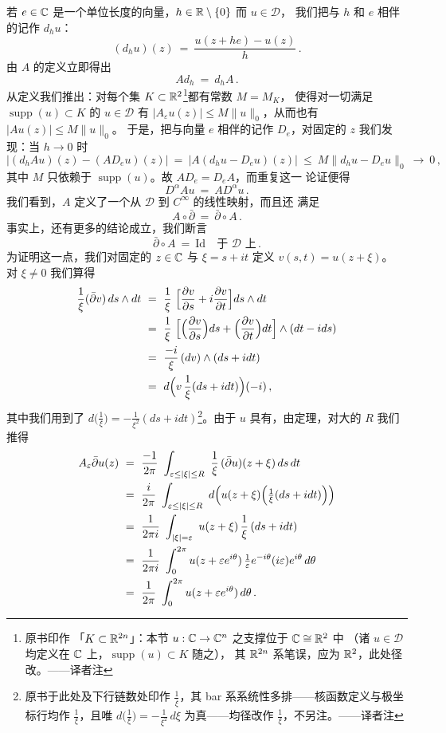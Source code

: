 若 $e\in\mathbb{C}$ 是一个单位长度的向量，$h\in\mathbb{R}\setminus\{0\}$ 而 $u\in\mathcal{D}$，%
我们把与 $h$ 和 $e$ 相伴的\trDifferenceQuotient{}记作 $d_{h}u$：
\[
(d_{h}u)(z)\ =\ \frac{u(z+he)-u(z)}{h}\,.
\]
由 $A$ 的定义立即得出
\[
Ad_{h}\ =\ d_{h}A\,.
\]
从定义我们推出：对每个\trCompact{}集 $K\subset\mathbb{R}^{2}$\footnote{原书印作%
「$K\subset\mathbb{R}^{2n}$」：本节 $u:\mathbb{C}\to\mathbb{C}^{n}$ 之支撑位于 $\mathbb{C}\cong\mathbb{R}^{2}$ 中%
（诸 $u\in\mathcal{D}$ 均定义在 $\mathbb{C}$ 上，$\operatorname{supp}(u)\subset K$ 随之），%
其 $\mathbb{R}^{2n}$ 系笔误，应为 $\mathbb{R}^{2}$，此处径改。——译者注}都有常数 $M=M_{K}$，%
使得对一切满足 $\operatorname{supp}(u)\subset K$ 的 $u\in\mathcal{D}$ 有%
 $|A_{\varepsilon}u(z)|\leq M\|u\|_{0}$，从而也有 $|Au(z)|\leq M\|u\|_{0}$。%
于是，把与向量 $e$ 相伴的\trDirectionalDerivative{}记作%
 $D_{e}$，对固定的 $z$ 我们发现：当 $h\to0$ 时
\[
\bigl|(d_{h}Au)(z)-(AD_{e}u)(z)\bigr|\ =\ \bigl|A(d_{h}u-D_{e}u)(z)\bigr|\ \leq\ M\|d_{h}u-D_{e}u\|_{0}\ \longrightarrow\ 0\,,
\]
其中 $M$ 只依赖于 $\operatorname{supp}(u)$。故 $AD_{e}=D_{e}A$，而重复这一%
论证便得
\[
D^{\alpha}Au\ =\ AD^{\alpha}u\,.
\]
我们看到，$A$ 定义了一个从 $\mathcal{D}$ 到 $C^{\infty}$ 的线性映射，而且还%
满足
\[
A\circ\bar{\partial}\ =\ \bar{\partial}\circ A\,.
\]
事实上，还有更多的结论成立，我们断言
\[
\bar{\partial}\circ A\ =\ \mathrm{Id}\quad\text{于 }\mathcal{D}\text{ 上}\,.
\]
为证明这一点，我们对固定的 $z\in\mathbb{C}$ 与 $\xi=s+it$ 定义 $v(s,t)=u(z+\xi)$。%
对 $\xi\neq0$ 我们算得
\begin{align*}
\frac{1}{\xi}(\bar{\partial}v)\,ds\wedge dt\ &=\ \frac{1}{\xi}\ \Bigl[\frac{\partial v}{\partial s}+i\frac{\partial v}{\partial t}\Bigr]ds\wedge dt\\
&=\ \frac{1}{\xi}\ \Bigl[\Bigl(\frac{\partial v}{\partial s}\Bigr)ds+\Bigl(\frac{\partial v}{\partial t}\Bigr)dt\Bigr]\wedge(dt-ids)\\
&=\ \frac{-i}{\xi}\,(dv)\wedge(ds+idt)\\
&=\ d\Bigl(v\,\frac{1}{\xi}(ds+idt)\Bigr)(-i)\,,
\end{align*}
其中我们用到了 $d\bigl(\frac{1}{\xi}\bigr)=-\frac{1}{\xi^{2}}(ds+idt)$\footnote{原书于此处及下行链数处印作 $\tfrac{1}{\bar{\xi}}$，其 bar 系系统性多排——核函数定义与极坐标行均作 $\tfrac{1}{\xi}$，且唯 $d\bigl(\tfrac{1}{\xi}\bigr)=-\tfrac{1}{\xi^{2}}\,d\xi$ 为真——均径改作 $\tfrac{1}{\xi}$，不另注。——译者注}。由于 $u$ %
具有\trCompactSupport，由\trStokes{}定理，对大的 $R$ 我们推得
\begin{align*}
A_{\varepsilon}\bar{\partial}u(z)\ &=\ \frac{-1}{2\pi}\ \int_{\varepsilon\leq|\xi|\leq R}\ \frac{1}{\xi}\,(\bar{\partial}u)(z+\xi)\,ds\,dt\\
&=\ \frac{i}{2\pi}\ \int_{\varepsilon\leq|\xi|\leq R}\ d\Bigl(u(z+\xi)\Bigl(\tfrac{1}{\xi}(ds+idt)\Bigr)\Bigr)\\
&=\ \frac{1}{2\pi i}\ \int_{|\xi|=\varepsilon}\ u(z+\xi)\,\frac{1}{\xi}\,(ds+idt)\\
&=\ \frac{1}{2\pi i}\ \int_{0}^{2\pi}u(z+\varepsilon e^{i\theta})\,\tfrac{1}{\varepsilon}e^{-i\theta}(i\varepsilon)e^{i\theta}\,d\theta\\
&=\ \frac{1}{2\pi}\ \int_{0}^{2\pi}u(z+\varepsilon e^{i\theta})\,d\theta\,.
\end{align*}

